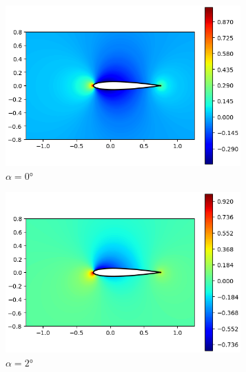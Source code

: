 \documentclass[letterpaper, openright, 12pt]{book}
\begin{document}
\begin{figure}[htbp!]
\begin{subfigure}[c]{0.48\textwidth}
            \includegraphics[keepaspectratio, width=0.99\textwidth]
                {./img/potential_flow_cp_0}
            \caption{$\alpha = 0\si{\degree}$}
            \label{fig:potential_flow_cp_0}
        \end{subfigure}
        \hfill
        \begin{subfigure}[c]{0.48\textwidth}
            \includegraphics[keepaspectratio, width=0.99\textwidth]
                {./img/potential_flow_cp_2}
            \caption{$\alpha = 2\si{\degree}$}
            \label{fig:potential_flow_cp_2}
        \end{subfigure}
        \begin{subfigure}[c]{0.48\textwidth}

\end{subfigure}
\end{figure}
\end{document}
